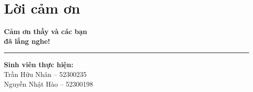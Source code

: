 
\section*{Lời cảm ơn}

\begin{frame}[c]
    \centering

    \vspace{0.8cm}
    {\Huge \textbf{\textcolor{primaryDark}{Cảm ơn thầy và các bạn\\đã lắng nghe!}}}

    \vspace{1.2cm}

    \hrule
    \vspace{0.5cm}

    {\Large \textbf{Sinh viên thực hiện:}} \\
    \vspace{0.3cm}
    {\large Trần Hữu Nhân -- 52300235} \\
    {\large Nguyễn Nhật Hào -- 52300198}
\end{frame}

